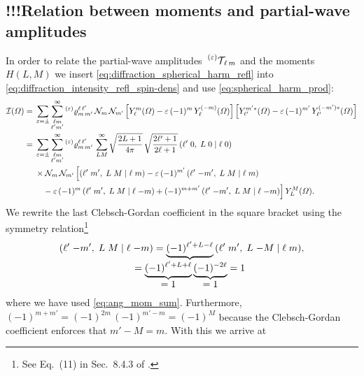 \subsection{!!!Relation between moments and partial-wave amplitudes}%

In order to relate the partial-wave
amplitudes~$\prescript{(\ensuremath{\varepsilon})}{}{\mathcal{T}}_{\!\ell\, m}$ and the
moments~$H(L, M)$ we insert \cref{eq:diffraction_spherical_harm_refl}
into \cref{eq:diffraction_intensity_refl_spin-dens} and use \cref{eq:spherical_harm_prod}:
\begin{align}
  \mathcal{I}(\Omega)
  ={}&
    \sum_{\refl = \pm} \sum_{\substack{\ell m \\ \ell' m'}}^\infty
    \prescript{(\refl)}{}{\varrho}^{\ell\, \ell'}_{m\, m'}\,
    \mathcal{N}_m\, \mathcal{N}_{m'}
    \sBrk[2]{Y_\ell^m(\Omega) - \refl\, (-1)^m\, Y_\ell^{(-m)}(\Omega)}
    \sBrk[2]{Y_{\ell'}^{m' *}(\Omega) - \refl\, (-1)^{m'}\, Y_{\ell'}^{(-m') *}(\Omega)}
  \\
  ={}& \begin{multlined}[t][0.85\columnwidth]
    \sum_{\refl = \pm} \sum_{\substack{\ell m \\ \ell' m'}}^\infty
    \prescript{(\refl)}{}{\varrho}^{\ell\, \ell'}_{m\, m'}\,
    \sum_{L M}^\infty \sqrt{\frac{2 L + 1}{4 \pi}}\, \sqrt{\frac{2 \ell' + 1}{2 \ell + 1}}\, \clebsch{\ell'}{0}{L}{0}{\ell}{0} \\
    \shoveleft{\times \mathcal{N}_m\, \mathcal{N}_{m'}\, \Big[ \clebsch{\ell'}{m'}{L}{M}{\ell}{m}                       - \refl\, (-1)^{m'}\, \clebsch{\ell'}{-m'}{L}{M}{\ell}{m}} \\
      - \refl\, (-1)^m\, \clebsch{\ell'}{m'}{L}{M}{\ell}{-m} + (-1)^{m + m'}\, \clebsch{\ell'}{-m'}{L}{M}{\ell}{-m} \Big]\,
    Y_L^M(\Omega).
  \end{multlined}
\end{align}
We rewrite the last Clebsch-Gordan coefficient in the square bracket
using the symmetry relation\footnote{See Eq.~(11) in Sec.~8.4.3 of
.}
\begin{equation}
  \clebsch{\ell'}{-m'}{L}{M}{\ell}{-m}
  = \cdUnderbrace{(-1)^{\ell' + L - \ell}}{= \dUnderbrace{(-1)^{\ell' + L + \ell}}{= 1}\, \dUnderbrace{(-1)^{-2 \ell}}{= 1} = 1}\, \clebsch{\ell'}{m'}{L}{-M}{\ell}{m},
\end{equation}
where we have used \cref{eq:ang_mom_sum}.  Furthermore, $(-1)^{m + m'}
= (-1)^{2m}\, (-1)^{m' - m} = (-1)^M$ because the Clebsch-Gordan
coefficient enforces that $m' - M = m$.  With this we arrive at
